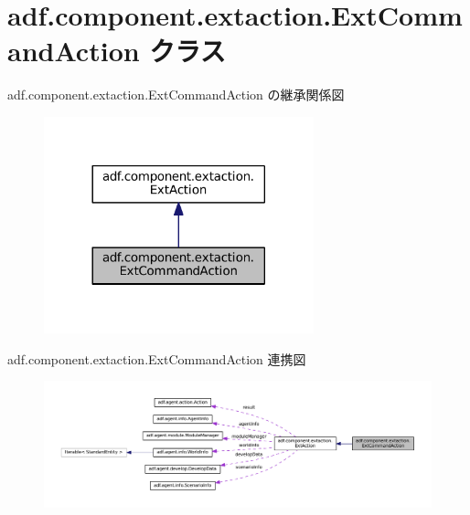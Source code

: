 \hypertarget{classadf_1_1component_1_1extaction_1_1ExtCommandAction}{}\section{adf.\+component.\+extaction.\+Ext\+Command\+Action クラス}
\label{classadf_1_1component_1_1extaction_1_1ExtCommandAction}


adf.\+component.\+extaction.\+Ext\+Command\+Action の継承関係図
\nopagebreak
\begin{figure}[H]
\begin{center}
\leavevmode
\includegraphics[width=221pt]{classadf_1_1component_1_1extaction_1_1ExtCommandAction__inherit__graph}
\end{center}
\end{figure}


adf.\+component.\+extaction.\+Ext\+Command\+Action 連携図
\nopagebreak
\begin{figure}[H]
\begin{center}
\leavevmode
\includegraphics[width=350pt]{classadf_1_1component_1_1extaction_1_1ExtCommandAction__coll__graph}
\end{center}
\end{figure}
